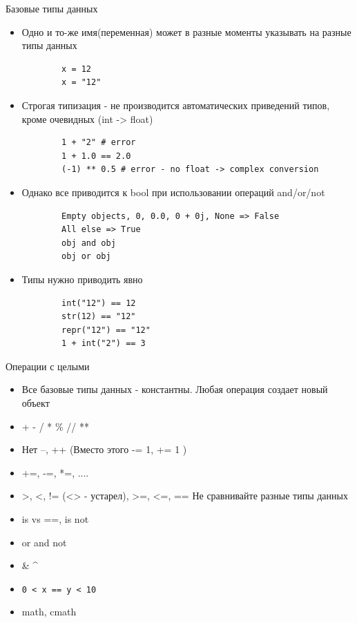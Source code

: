 \documentclass{article}
\begin{document}
\begin{center} Базовые типы данных \end{center}
\Large
{
\begin{itemize}
	\item Одно и то-же имя(переменная) может в разные моменты указывать на разные типы данных
	\vspace{15pt}
	\begin{lstlisting}
		x = 12
		x = "12"
	\end{lstlisting}

	\item Строгая типизация - не производится автоматических приведений типов, кроме очевидных (int -> float)
	\vspace{15pt}
	\begin{lstlisting}
		1 + "2" # error
		1 + 1.0 == 2.0
		(-1) ** 0.5 # error - no float -> complex conversion
	\end{lstlisting}

	\item Однако все приводится к bool при использовании операций and/or/not
	\begin{lstlisting}
		Empty objects, 0, 0.0, 0 + 0j, None => False
		All else => True
		obj and obj
		obj or obj
	\end{lstlisting}

	\item Типы нужно приводить явно
	\vspace{15pt}
	\begin{lstlisting}
		int("12") == 12
		str(12) == "12"
		repr("12") == "12"
		1 + int("2") == 3
	\end{lstlisting}
\end{itemize}
}
\newpage
\begin{center} Операции с целыми \end{center}
\begin{itemize}
	\item Все базовые типы данных - константны. Любая операция создает новый объект
	\item + - / * \% // **
	\item Нет --, ++ (Вместо этого -= 1, += 1 )
	\item +=, -=, *=, ....
	\item >, <, != (<> - устарел), >=, <=, == Не сравнивайте разные типы данных
	\item is vs ==, is not
	\item or and not
	\item \& \hspace{10pt} \textbar \hspace{10pt} \textasciicircum
	\item \lstinline!0 < x == y < 10!
	\item math, cmath

\end{itemize}
\newpage
\end{document}

